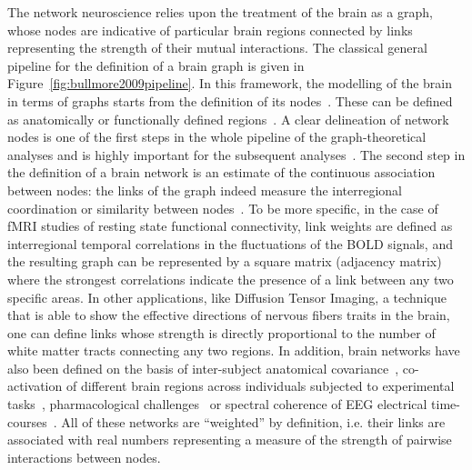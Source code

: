\documentclass[11pt,              a4paper,              twoside,openright,              titlepage,              headinclude,footinclude,                            numbers=noenddot,              cleardoublepage=empty,]{scrreprt}
\begin{document}
The network neuroscience relies upon the treatment of the brain as a graph, whose nodes are indicative of particular brain regions connected by links representing  the strength of their mutual interactions.
The classical general pipeline for the definition of a brain graph is given in Figure~\ref{fig:bullmore2009pipeline}.
In this framework, the modelling of the brain in terms of graphs starts from the definition of its nodes~\cite{stanley2013}.
These can be defined as anatomically or functionally defined regions~\cite{vandenheuvel2010}.
A clear delineation of network nodes is one of the first steps in the whole pipeline of the graph-theoretical analyses and is highly important for the subsequent analyses~\cite{stanley2013}.
The second step in the definition of a brain network is an estimate of the continuous association between nodes: the links of the graph indeed measure the interregional coordination or similarity between nodes~\cite{pereda2005a}.
To be more specific, in the case of fMRI studies of resting state functional connectivity, link weights are defined as interregional temporal correlations in the fluctuations of the BOLD signals, and the resulting graph can be represented by a square matrix (adjacency matrix) where the strongest correlations indicate the presence of a link between any two specific areas.
In other applications, like Diffusion Tensor Imaging, a technique that is able to show the effective directions of nervous fibers traits in the brain, one can define links whose strength is directly proportional to the number of white matter tracts connecting any two regions.
In addition, brain networks have also been defined on the basis of inter-subject anatomical covariance~\cite{evans2013,he2007}, co-activation of different brain regions across individuals subjected to experimental tasks~\cite{crossley2013a}, pharmacological challenges~\cite{schwarz2007,schwarz2008} or spectral coherence of EEG electrical time-courses~\cite{pereda2005a}.
All of these networks are ``weighted'' by definition, i.e. their links are associated with real numbers representing a measure of the strength of pairwise interactions between nodes.
\end{document}
